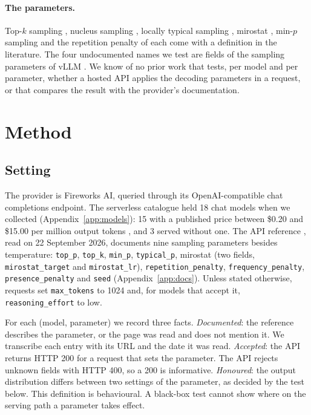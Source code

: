 \documentclass[10pt]{article}
\newcommand{\p}[1]{\texttt{#1}}
\begin{document}
\paragraph{The parameters.}
Top-$k$ sampling \citep{fan2018hierarchical}, nucleus sampling \citep{holtzman2020curious}, locally typical sampling \citep{meister2023typical}, mirostat \citep{basu2021mirostat}, min-$p$ sampling \citep{nguyen2025minp} and the repetition penalty of \citet{keskar2019ctrl} each come with a definition in the literature. The four undocumented names we test are fields of the sampling parameters of vLLM \citep{kwon2023vllm}. We know of no prior work that tests, per model and per parameter, whether a hosted API applies the decoding parameters in a request, or that compares the result with the provider's documentation.

\section{Method}
\label{sec:method}

\subsection{Setting}

The provider is Fireworks AI, queried through its OpenAI-compatible chat completions endpoint. The serverless catalogue held 18 chat models when we collected (Appendix~\ref{app:models}): 15 with a published price between \$0.20 and \$15.00 per million output tokens \citep{fireworks2026pricing}, and 3 served without one. The API reference \citep{fireworks2026reference}, read on 22 September 2026, documents nine sampling parameters besides temperature: \p{top\_p}, \p{top\_k}, \p{min\_p}, \p{typical\_p}, mirostat (two fields, \p{mirostat\_target} and \p{mirostat\_lr}), \p{repetition\_penalty}, \p{frequency\_penalty}, \p{presence\_penalty} and \p{seed} (Appendix~\ref{app:docs}). Unless stated otherwise, requests set \p{max\_tokens} to 1024 and, for models that accept it, \p{reasoning\_effort} to low.

For each (model, parameter) we record three facts. \emph{Documented}: the reference describes the parameter, or the page was read and does not mention it. We transcribe each entry with its URL and the date it was read. \emph{Accepted}: the API returns HTTP 200 for a request that sets the parameter. The API rejects unknown fields with HTTP 400, so a 200 is informative. \emph{Honoured}: the output distribution differs between two settings of the parameter, as decided by the test below. This definition is behavioural. A black-box test cannot show where on the serving path a parameter takes effect.
\end{document}
